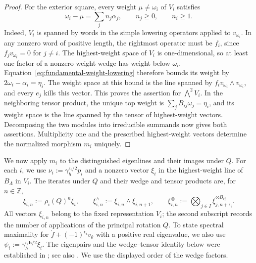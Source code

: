 \documentclass[11pt,leqno]{amsart}
\numberwithin{equation}{section}
\theoremstyle{plain}
\theoremstyle{definition}
\theoremstyle{plain}
\theoremstyle{definition}
\theoremstyle{remark}
\begin{document}
\begin{proof}
For the exterior square, every weight $\mu\ne\omega_i$ of $V_i$ satisfies
\begin{equation}\label{eq:fundamental-weight-lowering}
 \omega_i-\mu=\sum_j n_j\alpha_j,
 \qquad n_j\geq0,\qquad n_i\geq1.
\end{equation}
Indeed, $V_i$ is spanned by words in the simple lowering operators applied to $v_{\omega_i}$.  In any nonzero word of positive length, the rightmost operator must be $f_i$, since $f_jv_{\omega_i}=0$ for $j\ne i$.  The highest-weight space of $V_i$ is one-dimensional, so at least one factor of a nonzero weight wedge has weight below $\omega_i$.  Equation~\eqref{eq:fundamental-weight-lowering} therefore bounds its weight by $2\omega_i-\alpha_i=\eta_i$.  The weight space at this bound is the line spanned by $f_iv_{\omega_i}\wedge v_{\omega_i}$, and every $e_j$ kills this vector.  This proves the assertion for $\bigwedge^2V_i$.  In the neighboring tensor product, the unique top weight is $\sum_jB_{ij}\omega_j=\eta_i$, and its weight space is the line spanned by the tensor of highest-weight vectors.  Decomposing the two modules into irreducible summands now gives both assertions.
Multiplicity one and the prescribed highest-weight vectors determine the normalized morphism $m_i$ uniquely.
\end{proof}

We now apply $m_i$ to the distinguished eigenlines and their images under $Q$.
For each $i$, we use $\nu_i:=\gamma_h^{\epsilon_i/2}p_i$ and a nonzero vector $\xi_i$ in the highest-weight line of $B_\Lambda$ in $V_i$.  The iterates under $Q$ and their wedge and tensor products are, for $n\in\mathbb Z$,
\begin{equation}\label{eq:integral-cyclic-vectors}
 \xi_{i,n}:=\rho_i(Q)^n\xi_i,
 \qquad
 \xi_{i,n}^{\wedge}:=\xi_{i,n}\wedge\xi_{i,n+1},
 \qquad
 \xi_{i,n}^{\otimes}:=\bigotimes_{j\in I}\xi_{j,n+\epsilon_i}^{\otimes B_{ij}}.
\end{equation}
All vectors $\xi_{i,n}$ belong to the fixed representation $V_i$; the second subscript records the number of applications of the principal rotation $Q$.
To state spectral maximality for $\mathring f+(-1)^{\epsilon_i}v_\theta$ with a positive real eigenvalue, we also use $\psi_i:=\gamma_h^{\epsilon_i\mathbf h/2}\xi_i$.
The eigenpairs and the wedge--tensor identity below were established in \cite[Proposition~3.4 and Remark~3.5]{MRV2016}; see also \cite[Theorem~2.5]{MR2024}.  We use the displayed order of the wedge factors.
\end{document}
